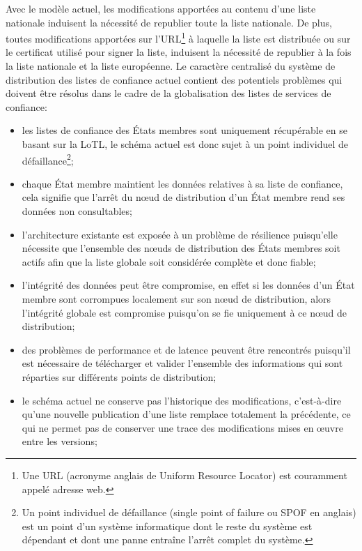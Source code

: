 \documentclass{tnreport}
\begin{document}
Avec le modèle actuel, les modifications apportées au contenu d'une liste nationale induisent la nécessité de republier toute la liste nationale. De plus, toutes modifications apportées sur l'URL\footnote{Une URL (acronyme anglais de Uniform Resource Locator) est couramment appelé adresse web.} à laquelle la liste est distribuée ou sur le certificat utilisé pour signer la liste, induisent la nécessité de republier à la fois la liste nationale et la liste européenne.
Le caractère centralisé du système de distribution des listes de confiance actuel contient des potentiels problèmes qui doivent être résolus dans le cadre de la globalisation des listes de services de confiance:
\begin{itemize}
	\item les listes de confiance des États membres sont uniquement récupérable en se basant sur la LoTL, le schéma actuel est donc sujet à un point individuel de défaillance\footnote{Un point individuel de défaillance (single point of failure ou SPOF en anglais) est un point d'un système informatique dont le reste du système est dépendant et dont une panne entraîne l'arrêt complet du système.};
	\item chaque État membre maintient les données relatives à sa liste de confiance, cela signifie que l'arrêt du nœud de distribution d'un État membre rend ses données non consultables;
	\item l'architecture existante est exposée à un problème de résilience puisqu'elle nécessite que l'ensemble des nœuds de distribution des États membres soit actifs afin que la liste globale soit considérée complète et donc fiable;
	\item l'intégrité des données peut être compromise, en effet si les données d'un État membre sont corrompues localement sur son nœud de distribution, alors l'intégrité globale est compromise puisqu'on se fie uniquement à ce nœud de distribution;
	\item des problèmes de performance et de latence peuvent être rencontrés puisqu'il est nécessaire de télécharger et valider l'ensemble des informations qui sont réparties sur différents points de distribution;
	\item le schéma actuel ne conserve pas l'historique des modifications, c'est-à-dire qu'une nouvelle publication d'une liste remplace totalement la précédente, ce qui ne permet pas de conserver une trace des modifications mises en œuvre entre les versions;
	\newline
\end{itemize}
\end{document}
